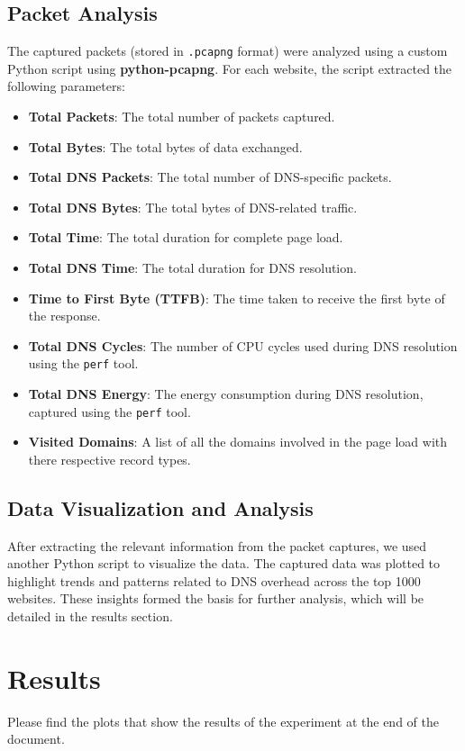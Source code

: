 \documentclass{article}
\begin{document}
\subsection{Packet Analysis}
The captured packets (stored in \texttt{.pcapng} format) were analyzed using a custom Python script using \textbf{python-pcapng}. For each website, the script extracted the following parameters:
\begin{itemize}
    \item \textbf{Total Packets}: The total number of packets captured.
    \item \textbf{Total Bytes}: The total bytes of data exchanged.
    \item \textbf{Total DNS Packets}: The total number of DNS-specific packets.
    \item \textbf{Total DNS Bytes}: The total bytes of DNS-related traffic.
    \item \textbf{Total Time}: The total duration for complete page load.
    \item \textbf{Total DNS Time}: The total duration for DNS resolution.
    \item \textbf{Time to First Byte (TTFB)}: The time taken to receive the first byte of the response.
    \item \textbf{Total DNS Cycles}: The number of CPU cycles used during DNS resolution using the \texttt{perf} tool.
    \item \textbf{Total DNS Energy}: The energy consumption during DNS resolution, captured using the \texttt{perf} tool.
    \item \textbf{Visited Domains}: A list of all the domains involved in the page load with there respective record types.
\end{itemize}

\subsection{Data Visualization and Analysis}
After extracting the relevant information from the packet captures, we used another Python script to visualize the data. The captured data was plotted to highlight trends and patterns related to DNS overhead across the top 1000 websites. These insights formed the basis for further analysis, which will be detailed in the results section.

\section{Results}
Please find the plots that show the results of the experiment at the end of the document.
\end{document}
